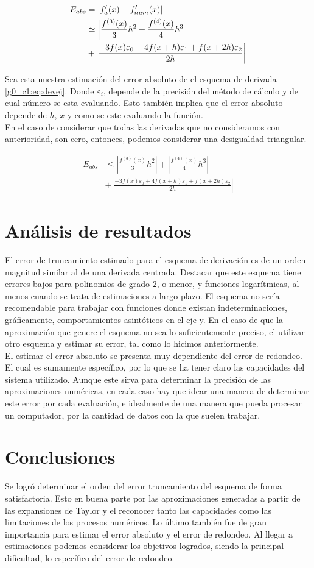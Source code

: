 \documentclass[../portafolio.tex]{subfiles}
\begin{document}
\begin{align}
E_{abs}&=\left|f'_a(x)-f'_{num}(x)\right|\\
&\simeq\left|\frac{f^{(3)}(x)}{3}h^2+\frac{f^{(4)}(x)}{4}h^3\right. \\
&+\left. \frac{-3f(x)\varepsilon_0+4f(x+h)\varepsilon_1+f(x+2h)\varepsilon_2}{2h}\right| \notag
\end{align}

Sea esta nuestra estimación del error absoluto de el esquema de derivada \eqref{g0_c1:eq:devej}. Donde $\varepsilon_i$, depende de la precisión del método de cálculo y de cual número se esta evaluando. Esto también implica que el error absoluto depende de $h$, $x$ y como se este evaluando la función.\\

En el caso de considerar que todas las derivadas que no consideramos con anterioridad, son cero, entonces, podemos considerar una desigualdad triangular.

\begin{align}
E_{abs}&\leq \left|\frac{f^{(3)}(x)}{3}h^2\right|+\left|\frac{f^{(4)}(x)}{4}h^3\right| \\
&+\left| \frac{-3f(x)\varepsilon_0+4f(x+h)\varepsilon_1+f(x+2h)\varepsilon_2}{2h}\right|
\end{align}
\section{Análisis de resultados}
El error de truncamiento estimado para el esquema de derivación es de un orden magnitud similar al de una derivada centrada. Destacar que este esquema tiene errores bajos para polinomios de grado 2, o menor, y funciones logarítmicas, al menos cuando se trata de estimaciones a largo plazo. El esquema no sería recomendable para trabajar con funciones donde existan indeterminaciones, gráficamente, comportamientos asintóticos en el eje y. En el caso de que la aproximación que genere el esquema no sea lo suficientemente preciso, el utilizar otro esquema y estimar su error, tal como lo hicimos anteriormente.\\

El estimar el error absoluto se presenta muy dependiente del error de redondeo. El cual es sumamente específico, por lo que se ha tener claro las capacidades del sistema utilizado. Aunque este sirva para determinar la precisión de las aproximaciones numéricas, en cada caso hay que idear una manera de determinar este error por cada evaluación, e idealmente de una manera que pueda procesar un computador, por la cantidad de datos con la que suelen trabajar.
\section*{Conclusiones}
Se logró determinar el orden del error truncamiento del esquema de forma satisfactoria. Esto en buena parte por las aproximaciones generadas a partir de las expansiones de Taylor y el reconocer tanto las capacidades como las limitaciones de los procesos numéricos. Lo último también fue de gran importancia para estimar el error absoluto y el error de redondeo. Al llegar a estimaciones podemos considerar los objetivos logrados, siendo la principal dificultad, lo específico del error de redondeo.
\end{document}
